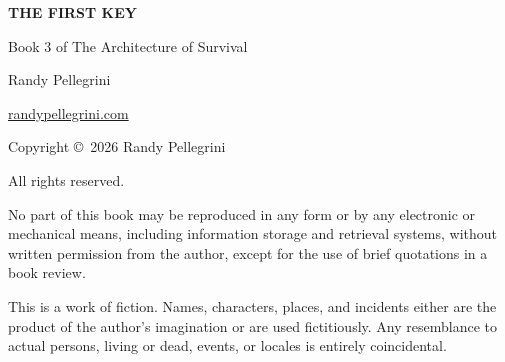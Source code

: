 \begin{titlepage}
\centering
\vspace*{4cm}
{\Huge\bfseries THE FIRST KEY\par}
\vspace{1cm}
{\Large Book 3 of The Architecture of Survival\par}
\vspace{2cm}
{\Large Randy Pellegrini\par}
\vfill
\href{https://randypellegrini.com}{randypellegrini.com}\par
\vspace{0.5cm}
Copyright \copyright\ 2026 Randy Pellegrini\par
All rights reserved.\par
\vspace{0.3cm}
{\small No part of this book may be reproduced in any form or by any electronic or mechanical means, including information storage and retrieval systems, without written permission from the author, except for the use of brief quotations in a book review.}\par
\vspace{0.3cm}
{\small This is a work of fiction. Names, characters, places, and incidents either are the product of the author's imagination or are used fictitiously. Any resemblance to actual persons, living or dead, events, or locales is entirely coincidental.}\par
\end{titlepage}
\newpage
